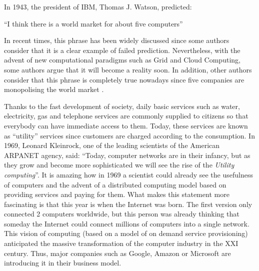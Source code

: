 In 1943, the president of IBM, Thomas J. Watson, predicted:

\begin{center}
``I think there is a world market for about five computers''
\end{center}

In recent times, this phrase has been widely discussed since some authors
consider that it is a clear example of failed prediction. Nevertheless, with the advent of new computational paradigms
such as Grid and Cloud Computing, some authors argue that it will become a reality soon. In addition,
other authors consider that this phrase is completely true nowadays since five companies are monopolising the world market \cite{Armbrust2009}.

Thanks to the fast development of society, daily basic services such as water, electricity, gas and telephone services 
are commonly supplied to citizens so that everybody can have 
immediate access to them. Today, these services are
known as ``utility'' services since customers are charged according to the consumption. In 1969, Leonard Kleinrock, one of the leading scientists of the American ARPANET agency, said: ``Today, computer networks are in their infancy, but as they grow and become more sophisticated we will see the rise of the \emph { Utility computing}''. It is amazing how in 1969 a scientist could already see the usefulness of computers and the advent of a distributed computing model 
based on providing services and paying for them. What makes this statement more fascinating is that this year is when the Internet was born. The first version only connected 2 computers worldwide, but this person was already thinking that someday the Internet could connect millions of computers into a single network. This vision of computing (based on a model of on demand service provisioning) anticipated the massive transformation of the computer industry in the XXI century. Thus, major companies such as Google, Amazon or Microsoft are introducing it in their business model. 


